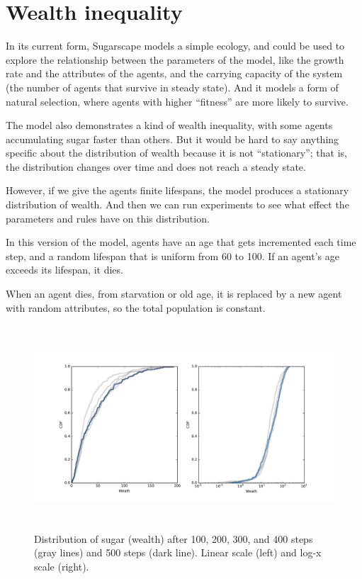 \documentclass[12pt]{book}
\theoremstyle{exercise}
\begin{document}
\section{Wealth inequality}

In its current form, Sugarscape models a simple ecology, and could
be used to explore the relationship between the parameters of the
model, like the growth rate and the attributes of the agents, and
the carrying capacity of the system (the number of agents that
survive in steady state).  And it models a form of natural selection,
where agents with higher ``fitness'' are more likely to survive.

The model also demonstrates a kind of wealth inequality, with some
agents accumulating sugar faster than others.  But it would be hard
to say anything specific about the distribution of wealth because it
is not ``stationary''; that is, the distribution changes over time and
does not reach a steady state.

However, if we give the agents finite lifespans, the model produces
a stationary distribution of wealth.  And then we can run experiments to
see what effect the parameters and rules have on this distribution.

In this version of the model, agents have an age that gets incremented
each time step, and a random lifespan that is uniform from 60 to 100.
If an agent's age exceeds its lifespan, it dies.

When an agent dies, from starvation or old age, it is replaced by
a new agent with random attributes, so the total population is
constant.

\begin{figure}
\centerline{\includegraphics[height=3in]{figs/chap09-4.pdf}}
\caption{Distribution of sugar (wealth) after 100, 200, 300, and
400 steps (gray lines) and 500 steps (dark line).  Linear scale (left)
and log-x scale (right). }
\label{chap09-4}
\end{figure}
\end{document}
